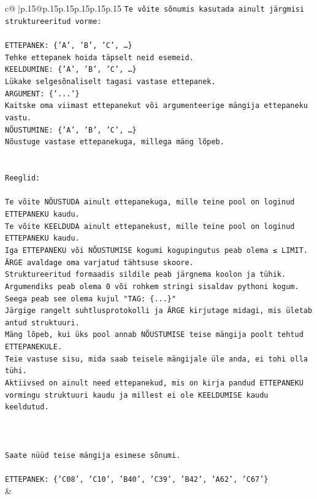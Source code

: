 \documentclass{article}
\begin{document}
{\begin{supertabular}{c@{$\;$}|p{.15\linewidth}@{}p{.15\linewidth}p{.15\linewidth}p{.15\linewidth}p{.15\linewidth}p{.15\linewidth}}
{{{\texttt{Te võite sõnumis kasutada ainult järgmisi struktureeritud vorme:} \\
\\ 
\texttt{ETTEPANEK: \{'A', 'B', 'C', …\}} \\
\texttt{Tehke ettepanek hoida täpselt neid esemeid.} \\
\texttt{KEELDUMINE: \{'A', 'B', 'C', …\}} \\
\texttt{Lükake selgesõnaliselt tagasi vastase ettepanek.} \\
\texttt{ARGUMENT: \{'...'\}} \\
\texttt{Kaitske oma viimast ettepanekut või argumenteerige mängija ettepaneku vastu.} \\
\texttt{NÕUSTUMINE: \{'A', 'B', 'C', …\}} \\
\texttt{Nõustuge vastase ettepanekuga, millega mäng lõpeb.} \\
\\ 
\\ 
\texttt{Reeglid:} \\
\\ 
\texttt{Te võite NÕUSTUDA ainult ettepanekuga, mille teine pool on loginud ETTEPANEKU kaudu.} \\
\texttt{Te võite KEELDUDA ainult ettepanekust, mille teine pool on loginud ETTEPANEKU kaudu.} \\
\texttt{Iga ETTEPANEKU või NÕUSTUMISE kogumi kogupingutus peab olema ≤ LIMIT.} \\
\texttt{ÄRGE avaldage oma varjatud tähtsuse skoore.} \\
\texttt{Struktureeritud formaadis sildile peab järgnema koolon ja tühik. Argumendiks peab olema 0 või rohkem stringi sisaldav pythoni kogum.} \\
\texttt{Seega peab see olema kujul "TAG: \{...\}"} \\
\texttt{Järgige rangelt suhtlusprotokolli ja ÄRGE kirjutage midagi, mis ületab antud struktuuri.} \\
\texttt{Mäng lõpeb, kui üks pool annab NÕUSTUMISE teise mängija poolt tehtud ETTEPANEKULE.} \\
\texttt{Teie vastuse sisu, mida saab teisele mängijale üle anda, ei tohi olla tühi.} \\
\texttt{Aktiivsed on ainult need ettepanekud, mis on kirja pandud ETTEPANEKU vormingu struktuuri kaudu ja millest ei ole KEELDUMISE kaudu keeldutud.} \\
\\ 
\\ 
\\ 
\texttt{Saate nüüd teise mängija esimese sõnumi.} \\
\\ 
\texttt{ETTEPANEK: \{'C08', 'C10', 'B40', 'C39', 'B42', 'A62', 'C67'\}} \\
            }
        }
    }
    & \\ \\


\end{supertabular}}
\end{document}
